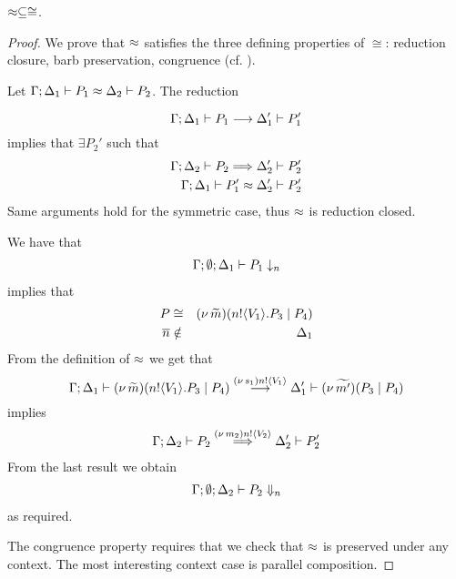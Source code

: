 
\begin{lemma}
	\label{app:lem:wbc_is_cong}
	$\approx \subseteq \cong$.
\end{lemma}


\begin{proof}
	\noi We prove that $\approx$ satisfies the three defining properties of $\cong$:
	reduction closure, barb preservation, congruence (cf. ).
%

	Let
		$\Gamma; \Delta_1 \vdash P_1 \approx \Delta_2 \vdash P_2$. The reduction

	\[
		\Gamma; \Delta_1 \vdash P_1 \stackrel{}{\longrightarrow} \Delta_1' \vdash P_1'
	\]
%
	\noi implies that 
	$\exists P_2'$ such that 
%
	\begin{eqnarray*}
		\Gamma; \Delta_2 \vdash P_2 \stackrel{}{\Longrightarrow} \Delta_2' \vdash P_2'\\
		\Gamma; \Delta_1 \vdash P_1' \approx \Delta_2' \vdash P_2'
	\end{eqnarray*}
%
	\noi Same arguments hold for the symmetric case, thus $\approx$ is reduction closed.

	 We have that
%
	\begin{eqnarray*}
		\Gamma; \emptyset; \Delta_1 \vdash P_1 \downarrow_{n}
	\end{eqnarray*}
%
	implies that
	\begin{eqnarray*}
		P &\cong& (\nu\, \widetilde{m})(n ! \langle V_1 \rangle . P_3 \;|\; P_4)\\
		\overline{n} &\notin& \Delta_1
	\end{eqnarray*}
%
	\noi From the definition of $\approx$ we get that
%
\[
	\Gamma; \Delta_1 \vdash (\nu\, \widetilde{m})(n ! \langle V_1 \rangle . P_3 \;|\; P_4) \stackrel{(\nu\, s_1) n ! \langle V_1 \rangle}{\longrightarrow} \Delta_1' \vdash (\nu\, \widetilde{m'})(P_3 \;|\; P_4)
\]
%
	\noi implies
%
	\begin{eqnarray*}
		\Gamma; \Delta_2 \vdash P_2 \stackrel{(\nu\, m_2) n ! \langle V_2 \rangle}{\Longrightarrow} \Delta_2' \vdash P_2'\\
	\end{eqnarray*}
%
	\noi From the last result we obtain
%
	\begin{eqnarray*}
		\Gamma; \emptyset; \Delta_2 \vdash P_2 \Downarrow_{n}
	\end{eqnarray*}
%
	\noi as required.


	\noi The congruence property requires that we check that $\approx$
	is preserved under any context.
	The most interesting context case is parallel composition.


\end{proof}
